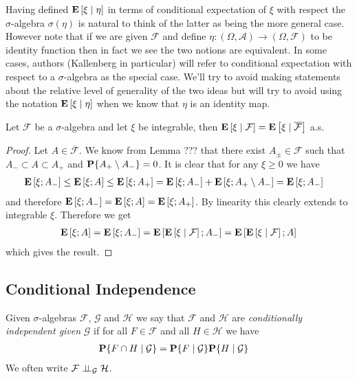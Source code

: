Having defined $\cexpectationlong{\eta}{\xi}$ in terms of conditional
expectation of $\xi$ with respect the $\sigma$-algebra $\sigma(\eta)$
is natural to think of the latter as being the more general case.
However note that if we are given $\mathcal{F}$ and define $\eta :
(\Omega, \mathcal{A}) \to (\Omega, \mathcal{F})$ to be identity
function then in fact we see the two notions are equivalent.  In some
cases, authors (Kallenberg in particular) will refer to conditional
expectation with respect to a $\sigma$-algebra as the special case.
We'll try to avoid making statements about the relative level of
generality of the two ideas but will try to avoid using the notation
$\cexpectationlong{\eta}{\xi}$ when we know that $\eta$ is an
identity map.

\begin{lem}\label{ConditionalExpectationCompletions}Let $\mathcal{F}$ be a $\sigma$-algebra and let $\xi$ be
  integrable, then $\cexpectationlong{\mathcal{F}}{\xi} =
  \cexpectationlong{\overline{\mathcal{F}}}{\xi}$ a.s.
\end{lem}
\begin{proof}
Let $A \in \overline{\mathcal{F}}$.  We know from Lemma ??? that there
exist $A_\pm \in \mathcal{F}$ such that $A_- \subset A \subset A_+$ and
$\probability{A_+ \setminus A_-} = 0$. It is clear that for any $\xi
\geq 0$ we have 
\begin{align*}
\expectation{\xi ; A_-} &\leq \expectation{\xi ; A} \leq
\expectation{\xi ; A_+} = \expectation{\xi; A_-} + \expectation{\xi;
  A_+ \setminus A_-} = \expectation{\xi; A_-} 
\end{align*}
and therefore $\expectation{\xi ; A_-} = \expectation{\xi; A} =
\expectation{\xi; A_+}$.  By linearity this clearly extends to
integrable $\xi$.  Therefore we get
\begin{align*}
\expectation{\xi; A} = \expectation{\xi; A_-} =
\expectation{\cexpectationlong{\mathcal{F}}{\xi}; A_-} = \expectation{\cexpectationlong{\mathcal{F}}{\xi}; A} 
\end{align*}
which gives the result.
\end{proof}

\subsection{Conditional Independence}

\begin{defn}Given $\sigma$-algebras $\mathcal{F}$, $\mathcal{G}$ and
  $\mathcal{H}$ we say that $\mathcal{F}$ and $\mathcal{H}$ are
  \emph{conditionally independent given} $\mathcal{G}$ if for all $F
  \in \mathcal{F}$ and all $H \in \mathcal{H}$ we have 
\begin{align*}
\cprobability{\mathcal{G}}{F \cap H} &= \cprobability{\mathcal{G}}{F} \cprobability{\mathcal{G}}{H} 
\end{align*}
We often write $\cindependent{\mathcal{F}}{\mathcal{H}}{\mathcal{G}}$.
\end{defn}

